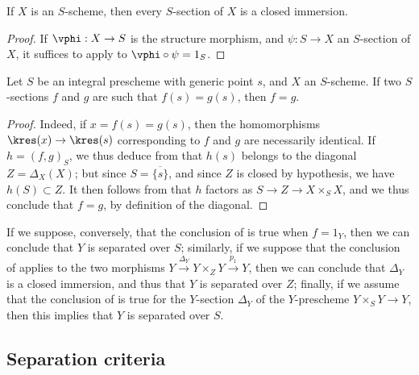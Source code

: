 \begin{corollary}[5.4.6]
\label{I.5.4.6}
If $X$ is an $S$-scheme, then every $S$-section of $X$  is a closed immersion.
\end{corollary}

\begin{proof}
If $\vphi:X\to S$ is the structure morphism, and $\psi:S\to X$ an $S$-section of $X$, it suffices to apply  to $\vphi\circ\psi=1_S$.
\end{proof}

\begin{corollary}[5.4.7]
\label{I.5.4.7}
Let $S$ be an integral prescheme with generic point $s$, and $X$ an $S$-scheme.
If two $S$-sections $f$ and $g$ are such that $f(s)=g(s)$, then $f=g$.
\end{corollary}

\begin{proof}
Indeed, if $x=f(s)=g(s)$, then the homomorphisms $\kres(x)\to\kres(s)$ corresponding to $f$ and $g$ are necessarily identical.
If $h=(f,g)_S$, we thus deduce from  that $h(s)$ belongs to the diagonal $Z=\Delta_X(X)$;
but since $S=\overline{\{s\}}$, and since $Z$ is closed by hypothesis, we have $h(S)\subset Z$.
It then follows from  that $h$ factors as $S\to Z\to X\times_S X$, and we thus conclude that $f=g$, by definition of the diagonal.
\end{proof}

\begin{remark}[5.4.8]
\label{I.5.4.8}
If we suppose, conversely, that the conclusion of  is true when $f=1_Y$, then we can conclude that $Y$ is separated over $S$;
similarly, if we suppose that the conclusion of  applies to the two morphisms $Y\xrightarrow{\Delta_Y}Y\times_Z Y\xrightarrow{p_1}Y$, then we can conclude that $\Delta_Y$ is a closed immersion, and thus that $Y$ is separated over $Z$;
finally, if we assume that the conclusion of  is true for the $Y$-section $\Delta_Y$ of the $Y$-prescheme $Y\times_S Y\to Y$, then this implies that $Y$ is separated over $S$.
\end{remark}

\subsection{Separation criteria}
\label{subsection:I.5.5}

